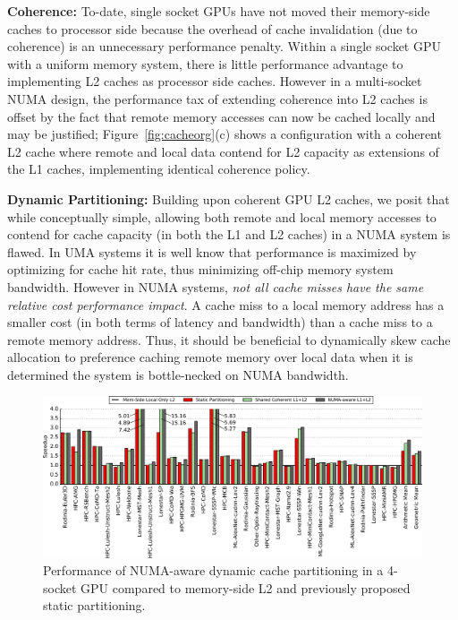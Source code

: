 \textbf{Coherence:} To-date, 
single socket GPUs have not moved their memory-side caches to processor side 
because the overhead of cache invalidation (due to coherence) is an 
unnecessary performance penalty.  Within a single socket GPU with a uniform
memory system, there is little performance advantage to implementing L2 caches
as processor side caches.  However in a multi-socket NUMA design, the performance tax
of extending coherence into L2 caches is offset by the fact that remote memory
accesses can now be cached locally and may be justified;
Figure~\ref{fig:cacheorg}(c) shows a configuration with 
a coherent L2 cache where remote and local data contend for L2 capacity as
extensions of the L1 caches, implementing identical coherence policy.

\textbf{Dynamic Partitioning:} Building upon coherent GPU L2 caches, we posit that while 
conceptually simple, allowing both remote and 
local memory accesses to contend for cache capacity (in both the L1 and L2 caches) 
in a NUMA system is flawed. In UMA systems it is well know that performance 
is maximized by optimizing for cache 
hit rate, thus minimizing off-chip memory system bandwidth. However in NUMA systems, 
\textit{not all cache misses have the same relative cost
performance impact}. A cache miss to a local memory address has a 
smaller cost (in both terms of latency and bandwidth) than a cache miss to a 
remote memory address. Thus, it should be beneficial to dynamically 
skew cache allocation to preference caching remote memory over 
local data when it is determined the system is bottle-necked on NUMA bandwidth.

\begin{figure}[t]
    \centering
    \includegraphics[width=1.0\textwidth]{figures/plot_merged_cache_WB.pdf}
    \caption{Performance of NUMA-aware dynamic cache partitioning in a 4-socket
	GPU compared to memory-side L2 and previously proposed static partitioning.}
    \label{fig:dynamiccaching}
        \vspace{-.2in}
\end{figure}

